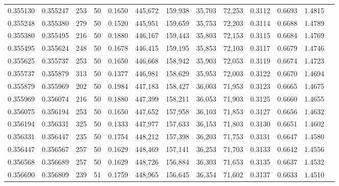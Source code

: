 \begin{tabular}{rrrrrrrrrrrrr}
0.355130 & 0.355247 &   253 &  50 &                                     0.1650 & 445,672 & 159,938 &  35,703 &  72,253 & 0.3112 & 0.6693 & 1.4815 \\
0.355248 & 0.355380 &   279 &  50 &                                     0.1520 & 445,951 & 159,659 &  35,753 &  72,203 & 0.3114 & 0.6688 & 1.4789 \\
0.355380 & 0.355495 &   216 &  50 &                                     0.1880 & 446,167 & 159,443 &  35,803 &  72,153 & 0.3115 & 0.6684 & 1.4769 \\
0.355495 & 0.355624 &   248 &  50 &                                     0.1678 & 446,415 & 159,195 &  35,853 &  72,103 & 0.3117 & 0.6679 & 1.4746 \\
0.355625 & 0.355737 &   253 &  50 &                                     0.1650 & 446,668 & 158,942 &  35,903 &  72,053 & 0.3119 & 0.6674 & 1.4723 \\
0.355737 & 0.355879 &   313 &  50 &                                     0.1377 & 446,981 & 158,629 &  35,953 &  72,003 & 0.3122 & 0.6670 & 1.4694 \\
0.355879 & 0.355969 &   202 &  50 &                                     0.1984 & 447,183 & 158,427 &  36,003 &  71,953 & 0.3123 & 0.6665 & 1.4675 \\
0.355969 & 0.356074 &   216 &  50 &                                     0.1880 & 447,399 & 158,211 &  36,053 &  71,903 & 0.3125 & 0.6660 & 1.4655 \\
0.356075 & 0.356194 &   253 &  50 &                                     0.1650 & 447,652 & 157,958 &  36,103 &  71,853 & 0.3127 & 0.6656 & 1.4632 \\
0.356194 & 0.356331 &   325 &  50 &                                     0.1333 & 447,977 & 157,633 &  36,153 &  71,803 & 0.3130 & 0.6651 & 1.4602 \\
0.356331 & 0.356447 &   235 &  50 &                                     0.1754 & 448,212 & 157,398 &  36,203 &  71,753 & 0.3131 & 0.6647 & 1.4580 \\
0.356447 & 0.356567 &   257 &  50 &                                     0.1629 & 448,469 & 157,141 &  36,253 &  71,703 & 0.3133 & 0.6642 & 1.4556 \\
0.356568 & 0.356689 &   257 &  50 &                                     0.1629 & 448,726 & 156,884 &  36,303 &  71,653 & 0.3135 & 0.6637 & 1.4532 \\
0.356690 & 0.356809 &   239 &  51 &                                     0.1759 & 448,965 & 156,645 &  36,354 &  71,602 & 0.3137 & 0.6633 & 1.4510 \\

\end{tabular}
